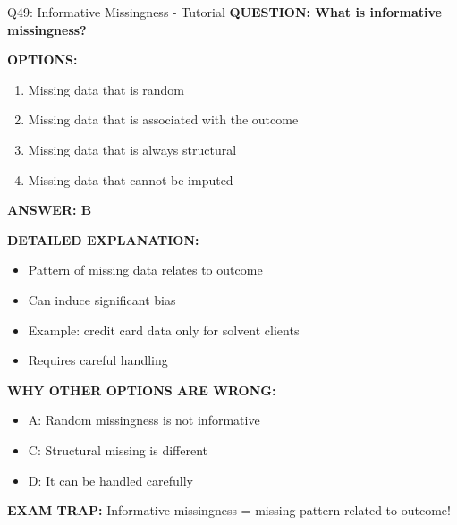 \documentclass[8pt]{beamer}
\begin{document}
	\begin{frame}{Q49: Informative Missingness - Tutorial}
		\fontsize{6.5}{7.5}\selectfont
		\textbf{QUESTION: What is informative missingness?}
		
		\vspace{0.1cm}
		\textbf{OPTIONS:}
		\begin{enumerate}
			\item Missing data that is random
			\item Missing data that is associated with the outcome
			\item Missing data that is always structural
			\item Missing data that cannot be imputed
		\end{enumerate}
		
		\vspace{0.1cm}
		\textcolor{myblue}{\textbf{ANSWER: B}}
		
		\vspace{0.1cm}
		\textbf{DETAILED EXPLANATION:}
		\begin{itemize}
			\item Pattern of missing data relates to outcome
			\item Can induce significant bias
			\item Example: credit card data only for solvent clients
			\item Requires careful handling
		\end{itemize}
		
		\vspace{0.1cm}
		\textcolor{myred}{\textbf{WHY OTHER OPTIONS ARE WRONG:}}
		\begin{itemize}
			\item \textcolor{myred}{A:} Random missingness is not informative
			\item \textcolor{myred}{C:} Structural missing is different
			\item \textcolor{myred}{D:} It can be handled carefully
		\end{itemize}
		
		\textcolor{myred}{\textbf{EXAM TRAP:}} Informative missingness = \textcolor{myblue}{missing pattern related to outcome}!
	\end{frame}
	
\end{document}
